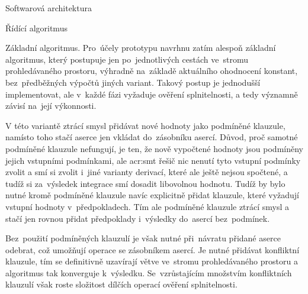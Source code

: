 \documentclass[thesis=M,czech]{FITthesis}[2012/06/26]
\newcommand{\acrlabel}[1]{acr:#1}
\newcommand{\acr}[1]{\acrshort{\acrlabel{#1}}}
\begin{document}
\begin{section}{Softwarová architektura}
\begin{subsection}{Řídící algoritmus}

\begin{paragraph}{Základní algoritmus.}
\label{ss:design:arch:alg:discuss}
Pro~účely prototypu navrhnu zatím alespoň základní algoritmus,
který postupuje jen po~jednotlivých
cestách ve~stromu prohledávaného prostoru,
výhradně na~základě aktuálního ohodnocení konstant,
bez~předběžných výpočtů jiných variant.
Takový postup je jednodušší implementovat,
ale v~každé fázi vyžaduje ověření splnitelnosti,
a tedy významně závisí na~její výkonnosti.

V této variantě ztrácí smysl přidávat
nové hodnoty jako podmíněné klauzule,
namísto toho stačí aserce jen vkládat do~zásobníku asercí.
Důvod, proč samotné podmíněné klauzule nefungují,
je ten, že nově vypočtené hodnoty
jsou podmíněny jejich vstupními podmínkami,
ale \acr{smt} řešič nic nenutí tyto vstupní podmínky zvolit
a smí si zvolit i~jiné varianty derivací,
které ale ještě nejsou spočtené,
a tudíž si za~výsledek integrace smí dosadit libovolnou hodnotu.
Tudíž by bylo nutné kromě podmíněné klauzule
navíc explicitně přidat klauzule,
které vyžadují vstupní hodnoty v~předpokladech.
Tím ale podmíněné klauzule ztrácí smysl
a stačí jen rovnou přidat předpoklady
i~výsledky do~asercí bez~podmínek.

Bez~použití podmíněných klauzulí
je však nutné při~návratu
přidané aserce odebrat,
což umožňují operace se zásobníkem asercí.
Je nutné přidávat konfliktní klauzule,
tím se definitivně uzavírají větve
ve~stromu prohledávaného prostoru
a algoritmus tak konverguje k~výsledku.
Se~vzrůstajícím množstvím konfliktních klauzulí
však roste složitost dílčích operací ověření splnitelnosti.


\end{paragraph}
\end{subsection}
\end{section}
\end{document}
